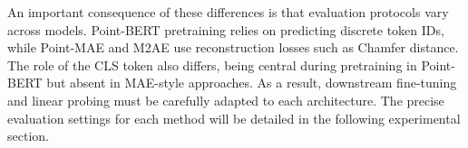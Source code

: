 An important consequence of these differences is that evaluation protocols vary across models. Point-BERT pretraining relies on predicting discrete token IDs, while Point-MAE and M2AE use reconstruction losses such as Chamfer distance. The role of the CLS token also differs, being central during pretraining in Point-BERT but absent in MAE-style approaches. As a result, downstream fine-tuning and linear probing must be carefully adapted to each architecture. The precise evaluation settings for each method will be detailed in the following experimental section.


